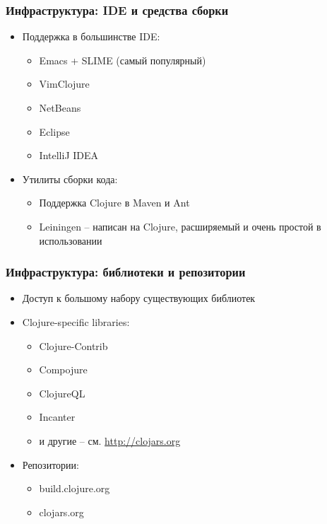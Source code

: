 \documentclass[ignorenonframetext]{beamer}
\begin{document}
\begin{frame}[t]
  \frametitle{Инфраструктура: IDE и средства сборки}
  \begin{itemize}
  \item Поддержка в большинстве IDE:
  \begin{itemize}
  \item Emacs + SLIME (самый популярный)
  \item VimClojure
  \item NetBeans
  \item Eclipse
  \item IntelliJ IDEA
  \end{itemize}
  \item Утилиты сборки кода:
    \begin{itemize}
    \item Поддержка Clojure в Maven и Ant
    \item Leiningen -- написан на Clojure, расширяемый и очень простой в использовании
    \end{itemize}
  \end{itemize}
\end{frame}

\begin{frame}[t]
  \frametitle{Инфраструктура: библиотеки и репозитории}
  \begin{itemize}
  \item Доступ к большому набору существующих библиотек
  \item Clojure-specific libraries:
    \begin{itemize}
    \item Clojure-Contrib
    \item Compojure
    \item ClojureQL
    \item Incanter
    \item и другие -- см. \url{http://clojars.org}
    \end{itemize}
  \item Репозитории:
    \begin{itemize}
    \item build.clojure.org
    \item clojars.org
    \end{itemize}
  \end{itemize}
\end{frame}
\end{document}
